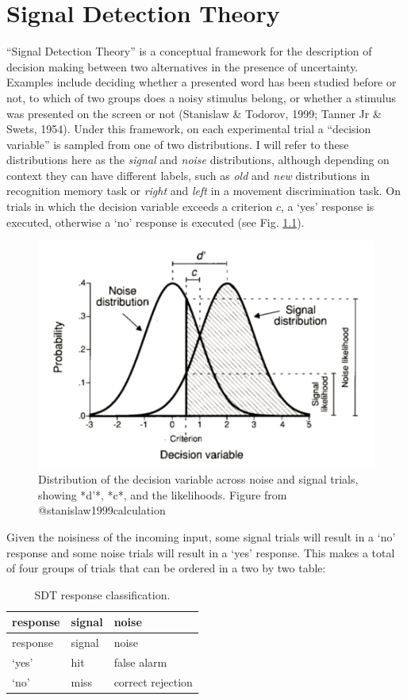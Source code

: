 \documentclass[12pt,twoside]{reedthesis}
\begin{document}
\appendix

\hypertarget{app1:SDT}{%
\chapter{Signal Detection Theory}\label{app1:SDT}}

``Signal Detection Theory'' is a conceptual framework for the description of decision making between two alternatives in the presence of uncertainty. Examples include deciding whether a presented word has been studied before or not, to which of two groups does a noisy stimulus belong, or whether a stimulus was presented on the screen or not (Stanislaw \& Todorov, 1999; Tanner Jr \& Swets, 1954). Under this framework, on each experimental trial a ``decision variable'' is sampled from one of two distributions. I will refer to these distributions here as the \emph{signal} and \emph{noise} distributions, although depending on context they can have different labels, such as \emph{old} and \emph{new} distributions in recognition memory task or \emph{right} and \emph{left} in a movement discrimination task. On trials in which the decision variable exceeds a criterion \(c\), a `yes' response is executed, otherwise a `no' response is executed (see Fig. \ref{fig:app1-SDT}).
\begin{figure}
\includegraphics[width=0.7\linewidth]{figure/app-SDT/SDT} \caption[Signal Detection Theory]{Distribution of the decision variable across noise and signal trials, showing *d'*, *c*, and the likelihoods. Figure from @stanislaw1999calculation}\label{fig:app1-SDT}
\end{figure}
Given the noisiness of the incoming input, some signal trials will result in a `no' response and some noise trials will result in a `yes' response. This makes a total of four groups of trials that can be ordered in a two by two table:
\begin{longtable}[]{@{}lll@{}}
\caption{\label{tab:app1SDT} SDT response classification.}\tabularnewline
\toprule
response & signal & noise\tabularnewline
\midrule
\endfirsthead
\toprule
response & signal & noise\tabularnewline
\midrule
\endhead
`yes' & hit & false alarm\tabularnewline
`no' & miss & correct rejection\tabularnewline
\bottomrule
\end{longtable}
\end{document}
